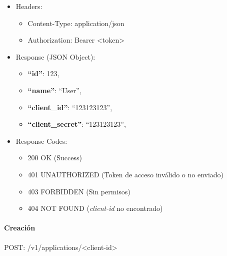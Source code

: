 \documentclass[12pt,a4paperpaper,]{report}
\providecommand{\tightlist}{%
  \setlength{\itemsep}{0pt}\setlength{\parskip}{0pt}}
\let\oldparagraph\paragraph
\renewcommand{\paragraph}[1]{\oldparagraph{#1}\mbox{}}
\begin{document}
\begin{itemize}
\tightlist
\item
  Headers:

  \begin{itemize}
  \tightlist
  \item
    Content-Type: application/json
  \item
    Authorization: Bearer \textless{}token\textgreater{}
  \end{itemize}
\item
  Response (JSON Object):

  \begin{itemize}
  \tightlist
  \item
    \textbf{``id''}: 123,
  \item
    \textbf{``name''}: ``User'',
  \item
    \textbf{``client\_id''}: ``123123123'',
  \item
    \textbf{``client\_secret''}: ``123123123'',
  \end{itemize}
\item
  Response Codes:

  \begin{itemize}
  \tightlist
  \item
    200 OK (Success)
  \item
    401 UNAUTHORIZED (Token de acceso inválido o no enviado)
  \item
    403 FORBIDDEN (Sin permisos)
  \item
    404 NOT FOUND (\emph{client-id} no encontrado)
  \end{itemize}
\end{itemize}

\paragraph{Creación}\label{creaciuxf3n-2}

POST: /v1/applications/\textless{}client-id\textgreater{}
\end{document}
